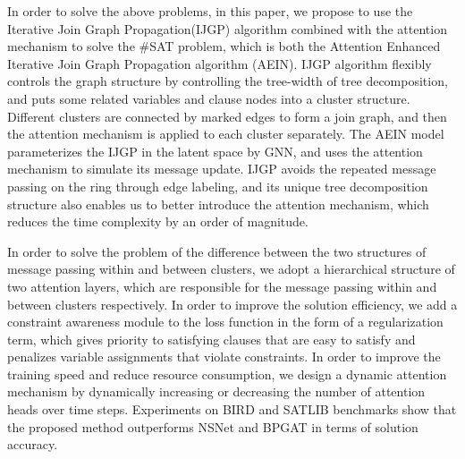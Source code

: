 In order to solve the above problems, in this paper, we propose to use the Iterative Join Graph 
Propagation(IJGP)\cite{DBLP:journals/corr/abs-1301-0564} algorithm combined with the attention
mechanism to solve the \#SAT problem, which is both the Attention Enhanced Iterative Join Graph 
Propagation algorithm (AEIN). IJGP algorithm flexibly controls the graph structure by controlling 
the tree-width of tree decomposition, and puts some related variables and clause nodes into a cluster 
structure. Different clusters are connected by marked edges to form a join graph, and then the 
attention mechanism is applied to each cluster separately. The AEIN model parameterizes the IJGP 
in the latent space by GNN, and uses the attention mechanism to simulate its message update. IJGP 
avoids the repeated message passing on the ring through edge labeling, and its unique tree decomposition 
structure also enables us to better introduce the attention mechanism, which reduces the time complexity 
by an order of magnitude.

In order to solve the problem of the difference between the two structures of message passing within 
and between clusters, we adopt a hierarchical structure of two attention layers, which are responsible 
for the message passing within and between clusters respectively. In order to improve the solution 
efficiency, we add a constraint awareness module to the loss function in the form of a regularization 
term, which gives priority to satisfying clauses that are easy to satisfy and penalizes variable assignments 
that violate constraints. In order to improve the training speed and reduce resource consumption, we 
design a dynamic attention mechanism\cite{DBLP:conf/icip/LiCLCSQW23}\cite{DBLP:journals/nn/ZhangLWWW24} 
by dynamically increasing or decreasing the number of attention heads over time steps. Experiments on 
BIRD and SATLIB benchmarks show that the proposed method outperforms NSNet and BPGAT in terms of solution 
accuracy.
